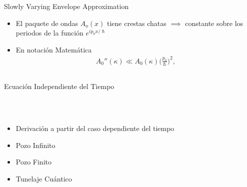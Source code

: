 \documentclass[aspectratio=1610]{beamer}
\begin{document}
\begin{frame}{Slowly Varying Envelope Approximation}

\begin{itemize}
    \item El paquete de ondas $A_{o}(x)$ tiene crestas chatas $\implies$ constante sobre los periodos de la función $e^{ip_{0}x/\hslash}$
    \vspace{0.1\textheight} 
    \item En notación Matemática
    \begin{align*} 
    A_{0}''(\kappa) \ll A_{0}(\kappa)\bigg(\frac{p_{0}}{\hslash}\bigg)^2,
    \end{align*}
\end{itemize} 
\end{frame}


\begin{frame}
\begin{columns}
\column{37em}
\vspace{1cm}
\Huge{\centerline{Ecuación Independiente del Tiempo}}
\end{columns}
\end{frame}

\begin{frame}
\frametitle{ }
\begin{columns}
\column{37em}
\begin{itemize}\itemsep1em
  \justifying
  \item  \textcolor{Ocean}{Derivación a partir del caso dependiente del tiempo} 
  \item  \textcolor{Ocean}{Pozo Infinito} 
  \item  \textcolor{Ocean}{Pozo Finito} 
  \item  \textcolor{Ocean}{Tunelaje Cuántico}
\end{itemize}
\end{columns}
\end{frame}
\end{document}
